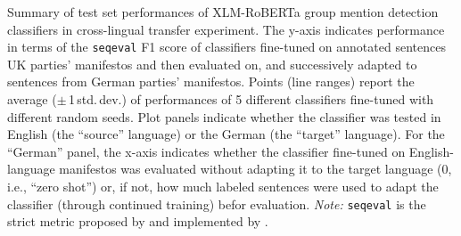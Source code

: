 Summary of test set performances of XLM-RoBERTa group mention detection classifiers in cross-lingual transfer experiment. The y-axis indicates performance in terms of the \texttt{seqeval} F1 score of classifiers fine-tuned on annotated sentences UK parties' manifestos and then evaluated on, and successively adapted to sentences from German parties' manifestos. Points (line ranges) report the average ($\pm$\,1\,std.\,dev.) of performances of 5 different classifiers fine-tuned with different random seeds. Plot panels indicate whether the classifier was tested in English (the ``source'' language) or the German (the ``target'' language). For the ``German'' panel, the x-axis indicates whether the classifier fine-tuned on English-language manifestos was evaluated without adapting it to the target language (0, i.e., ``zero shot'') or, if not, how much labeled sentences were used to adapt the classifier (through continued training) befor evaluation. \emph{Note:} \texttt{seqeval} is the strict metric proposed by \citet{ramshaw_text_1995} and implemented by \citet{nakayama_seqeval_2018}. \label{fig:manifestos_cross-lingual-transfer_roberta-finetuning_testset}
